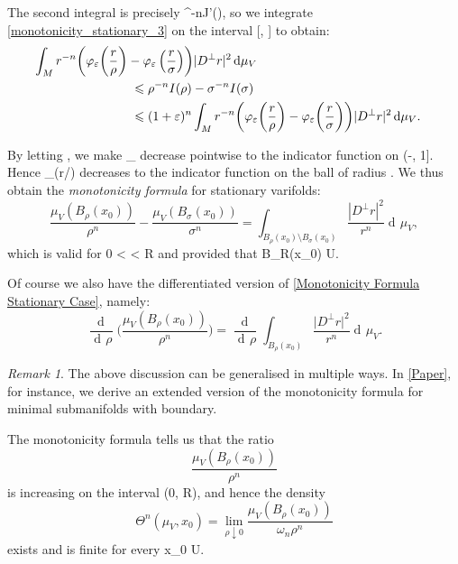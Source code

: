 \documentclass[a4paper, 11pt]{article}
\theoremstyle{plain}
\theoremstyle{definition}
\theoremstyle{remark}
\newtheorem*{remark}{Remark}
\DeclareMathOperator{\diff}{d \!}
\numberwithin{equation}{subsection}
\def\({}
\def\){}
\begin{document}
The second integral is precisely \(\rho^{-n}J'(\rho)\), so we integrate \eqref{monotonicity_stationary_3} on the interval \([\sigma, \rho]\) to obtain:
\begin{align}
\int_{M}r^{-n}\biggl(\varphi_{\varepsilon}\biggl(\frac{r}{\rho}\biggr) - \varphi_{\varepsilon}\left(\frac{r}{\sigma}\right)\biggr) \vert D^{\perp}r \vert^{2} \diff\mu_{V} \hspace{-100pt} \\
&\leqslant \rho^{-n}I(\rho) - \sigma^{-n}I(\sigma) \\
&\leqslant (1+\varepsilon)^n\int_{M}r^{-n}\biggl(\varphi_{\varepsilon}\biggl(\frac{r}{\rho}\biggr) - \varphi_{\varepsilon} \biggl(\frac{r}{\sigma}\biggr)\biggr) \vert D^{\perp}r \vert^{2} \diff\mu_{V}.
\end{align}

By letting \(\varepsilon {}\), we make \(\varphi_{\varepsilon}\) decrease pointwise to the indicator function on \((-\infty, 1]\). Hence \(\varphi_{\varepsilon}(r/\rho)\) decreases to the indicator function on the ball of radius \(\rho\). We thus obtain the \emph{monotonicity formula} for stationary varifolds:
\begin{equation}
\label{Monotonicity Formula Stationary Case}
\frac{\mu_{V}(B_{\rho}(x_0))}{\rho^{n}} - \frac{\mu_{V}(B_{\sigma}(x_0))}{\sigma^{n}} = \int_{B_{\rho}(x_0) \setminus B_{\sigma}(x_0)}\frac{|D^{\perp}r|^2}{r^{n}}\diff\mu_{V},
\end{equation}
which is valid for \(0 < \sigma \leqslant \rho < R\) and provided that \(B_{R}(x_0) \subset U\).

Of course we also have the differentiated version of \eqref{Monotonicity Formula Stationary Case}, namely:
\begin{equation}
\frac{\!\diff}{\diff\rho}\biggl(\frac{\mu_{V}(B_{\rho}(x_0))}{\rho^{n}}\biggr) = \frac{\!\diff}{\diff\rho}\int_{B_{\rho}(x_0)}\frac{\vert D^{\perp}r \vert^2}{r^{n}}\diff\mu_{V}.
\end{equation}

\begin{remark}
The above discussion can be generalised in multiple ways. In \cref{Paper}, for instance, we derive an extended version of the monotonicity formula for minimal submanifolds with boundary.
\end{remark}

The monotonicity formula tells us that the ratio
\begin{equation}
\frac{\mu_{V}(B_{\rho}(x_0))}{\rho^{n}}
\end{equation}
is increasing on the interval \((0, R)\), and hence the density
\begin{equation}
\Theta^{n}(\mu_V, x_0) = \lim_{\rho \downarrow 0} \frac{\mu_{V}(B_{\rho}(x_0))}{\omega_{n}\rho^{n}}
\end{equation}
exists and is finite for every \(x_0 \in U\).
\end{document}
